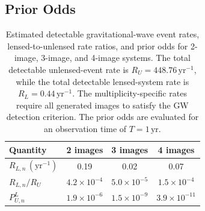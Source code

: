 \documentclass[pdflatex,sn-mathphys-num]{sn-jnl}%
\theoremstyle{thmstyleone}%
\theoremstyle{thmstyletwo}%
\theoremstyle{thmstylethree}%
\begin{document}
\subsection{Prior Odds}
\begin{table}[h!]
    \centering
    \caption{
    Estimated detectable gravitational-wave event rates,
    lensed-to-unlensed rate ratios, and prior odds for
    2-image, 3-image, and 4-image systems.
    The total detectable unlensed-event rate is
    $R_U=448.76\,\mathrm{yr}^{-1}$, while the total
    detectable lensed-system rate is
    $R_L=0.44\,\mathrm{yr}^{-1}$.
    The multiplicity-specific rates require all generated
    images to satisfy the GW detection criterion.
    The prior odds are evaluated for an observation time
    of $T=1\,\mathrm{yr}$.
    }
    \begin{tabular}{lccc}
        \hline
        Quantity & 2 images & 3 images & 4 images \\
        \hline
        $R_{L,n}\,(\mathrm{yr}^{-1})$
        & 0.19 & 0.02 & 0.07 \\

        $R_{L,n}/R_U$
        & $4.2\times10^{-4}$
        & $5.0\times10^{-5}$
        & $1.5\times10^{-4}$ \\

        $P_{U,n}^{L}$
        & $1.9\times10^{-6}$
        & $1.5\times10^{-9}$
        & $3.9\times10^{-11}$ \\
        \hline
    \end{tabular}
    \label{tab:prior_odds}
\end{table}
\end{document}
